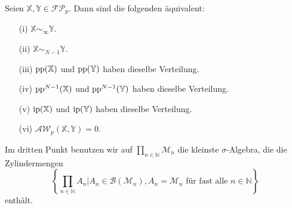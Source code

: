     \begin{theorem}\label{thm:awp_0_characterization}
        Seien $\mathbb{X,Y} \in \mathcal{FP}_p$. Dann sind die folgenden äquivalent:

        \begin{enumerate}
            \item[(i)] $\mathbb{X} \sim_\infty \mathbb{Y}$.
            \item[(ii)] $\mathbb{X} \sim_{N-1} \mathbb{Y}$.
            \item[(iii)] $\operatorname{pp}(\mathbb{X})$ und $\operatorname{pp}(\mathbb{Y})$ haben dieselbe Verteilung.
            \item[(iv)] $\operatorname{pp}^{N-1}(\mathbb{X})$ und $\operatorname{pp}^{N-1}(\mathbb{Y})$ haben dieselbe Verteilung.
            \item[(v)] $\operatorname{ip}(\mathbb{X})$ und $\operatorname{ip}(\mathbb{Y})$ haben dieselbe Verteilung.
            \item[(vi)] $\mathcal{AW}_p(\mathbb{X}, \mathbb{Y})=0$.
        \end{enumerate}
        Im dritten Punkt benutzen wir auf $\prod_{n \in \mathbb{N}} \mathcal{M}_n$ die kleinste $\sigma$-Algebra, die die Zylindermengen
        $$\left\{ \prod_{n\in\mathbb{N}} A_n \vert A_n \in \mathcal{B}(\mathcal{M}_n), A_n = \mathcal{M}_n \text{ für fast alle } n \in \mathbb{N}\right\}$$
        enthält.
    \end{theorem}
